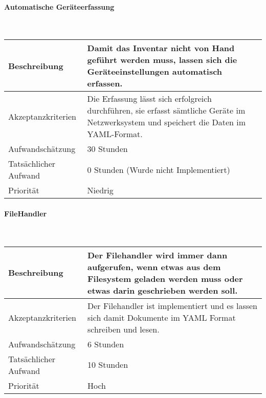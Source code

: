 \documentclass[]{subfiles}
\begin{document}
        \paragraph*{Automatische Geräteerfassung}\mbox{} \\
        \begin{tabularx}{\textwidth}{lX}
            \toprule
            Beschreibung & Damit das Inventar nicht von Hand geführt werden muss, lassen sich die Geräteeinstellungen automatisch erfassen.\\
            \midrule
            Akzeptanzkriterien & Die Erfassung lässt sich erfolgreich durchführen, sie erfasst sämtliche Geräte im Netzwerksystem und speichert die Daten im YAML-Format.\\
            \midrule
            Aufwandschätzung & 30 Stunden\\
            Tatsächlicher Aufwand & 0 Stunden (Wurde nicht Implementiert)\\ 
            \midrule
            Priorität & Niedrig\\
            \bottomrule
        \end{tabularx}
        \newpage
    
    
        \paragraph*{FileHandler}\mbox{} \\
        \begin{tabularx}{\textwidth}{lX}
            \toprule
            Beschreibung & Der Filehandler wird immer dann aufgerufen, wenn etwas aus dem Filesystem geladen werden muss oder etwas darin geschrieben werden soll.\\
            \midrule
            Akzeptanzkriterien & Der Filehandler ist implementiert und es lassen sich damit Dokumente im YAML Format schreiben und lesen.\\
            \midrule
            Aufwandschätzung & 6 Stunden\\
            Tatsächlicher Aufwand & 10 Stunden\\ 
            \midrule
            Priorität & Hoch\\
            \bottomrule
        \end{tabularx}
    
\end{document}
